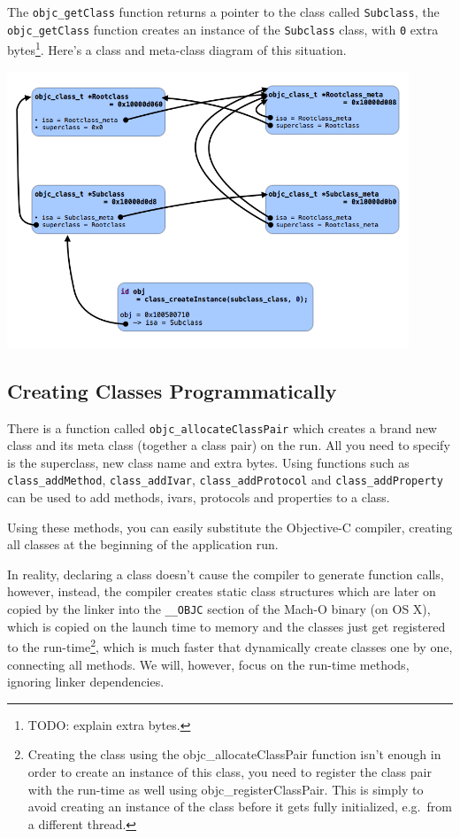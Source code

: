 \documentclass[a4paper, 11pt, fleqn]{book}
\begin{document}
The \verb=objc_getClass= function returns a pointer to the class called \verb=Subclass=, the \verb=objc_getClass= function creates an instance of the \verb=Subclass= class, with \verb=0= extra bytes\footnote{TODO: explain extra bytes.}. Here's a class and meta-class diagram of this situation.

\includegraphics[width=120mm]{metaclass_graph.png}

\subsection{Creating Classes Programmatically}

There is a function called \verb=objc_allocateClassPair= which creates a brand new class and its meta class (together a class pair) on the run. All you need to specify is the superclass, new class name and extra bytes. Using functions such as \verb=class_addMethod=, \verb=class_addIvar=, \verb=class_addProtocol= and \verb=class_addProperty= can be used to add methods, ivars, protocols and properties to a class.

Using these methods, you can easily substitute the Objective-C compiler, creating all classes at the beginning of the application run. 

In reality, declaring a class doesn't cause the compiler to generate function calls, however, instead, the compiler creates static class structures which are later on copied by the linker into the \verb=__OBJC= section of the Mach-O binary (on OS X), which is copied on the launch time to memory and the classes just get registered to the run-time\footnote{Creating the class using the objc\_allocateClassPair function isn't enough in order to create an instance of this class, you need to register the class pair with the run-time as well using objc\_registerClassPair. This is simply to avoid creating an instance of the class before it gets fully initialized, e.g.\ from a different thread.}, which is much faster that dynamically create classes one by one, connecting all methods. We will, however, focus on the run-time methods, ignoring linker dependencies.
\end{document}

